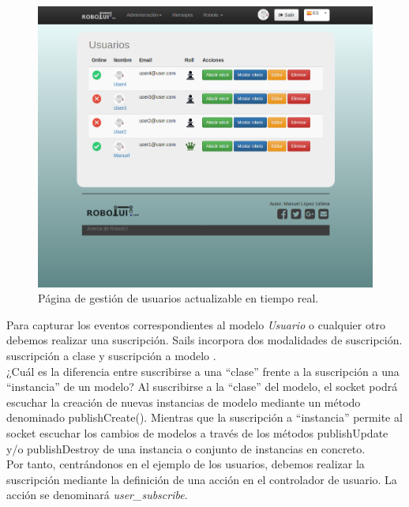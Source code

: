 \begin{figure}[H]
  \begin{center}
    \includegraphics[scale=0.35]{imagenes/comunicaciones/index-usuarios.png}
  \end{center}
  \caption{Página de gestión de usuarios actualizable en tiempo real.}
  \label{view:userindex}
\end{figure}

Para capturar los eventos correspondientes al modelo \emph{Usuario} o cualquier otro debemos realizar una suscripción. Sails incorpora dos modalidades de suscripción. suscripción a clase y 
suscripción a modelo \cite{book:sails}.\\

¿Cuál es la diferencia entre suscribirse a una ``clase'' frente a la suscripción a una ``instancia'' de un modelo? Al suscribirse a la ``clase'' del modelo, el socket podrá escuchar la creación de 
nuevas instancias de modelo mediante un método denominado publishCreate(). Mientras que la suscripción a ``instancia'' permite al socket escuchar los cambios de modelos a través de los métodos
publishUpdate y/o publishDestroy de una instancia o conjunto de instancias en concreto.\\


Por tanto, centrándonos en el ejemplo de los usuarios, debemos realizar la suscripción mediante la definición de una acción en el controlador de usuario. La acción se denominará \emph{user\_subscribe}.\\

